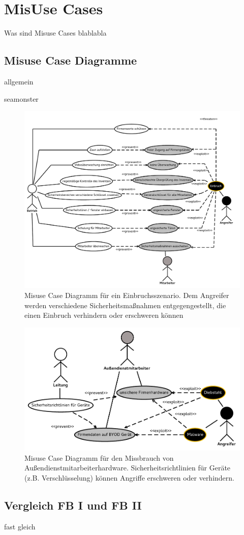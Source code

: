 \section{MisUse Cases}

Was sind Misuse Cases blablabla


\subsection{Misuse Case Diagramme}

allgemein

seamonster

\begin{figure}
\caption{Misuse Case Diagramm für ein Einbruchsszenario. Dem Angreifer werden verschiedene Sicherheitsmaßnahmen entgegengestellt, die einen Einbruch verhindern oder erschweren können}
\includegraphics[scale=0.8,angle=90]{images/MisUseCaseEinbruch.pdf} 
\end{figure}

\begin{figure}
\caption{Misuse Case Diagramm für den Missbrauch von Außendienstmitarbeiterhardware. Sicherheitsrichtlinien für Geräte (z.B. Verschlüsselung) können Angriffe erschweren oder verhindern.}
\includegraphics[scale=0.8]{images/Hardware.pdf} 
\end{figure}



\subsection{Vergleich FB I und FB II}

fast gleich